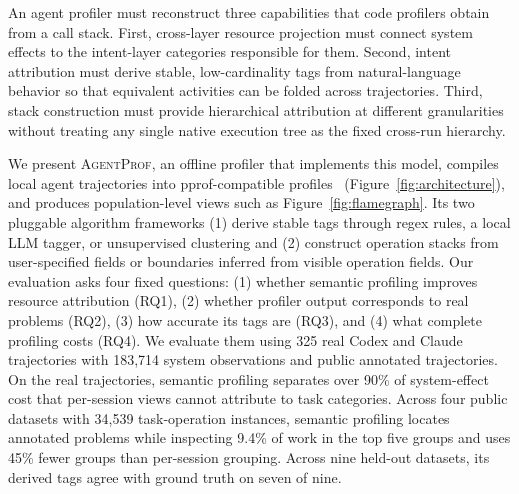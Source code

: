 \documentclass[letterpaper]{article}
\newcommand{\sys}{\textsc{AgentProf}\xspace}
\begin{document}
An agent profiler must reconstruct three capabilities that code profilers
obtain from a call stack.
First, cross-layer resource projection must connect system effects to
the intent-layer categories responsible for them.
Second, intent attribution must derive stable, low-cardinality tags
from natural-language behavior so that equivalent activities can be
folded across trajectories.
Third, stack construction must provide hierarchical attribution at
different granularities without treating any single native execution
tree as the fixed cross-run hierarchy.

We present \sys, an offline profiler that implements this model,
compiles local agent trajectories into pprof-compatible profiles~\cite{pprof}
(Figure~\ref{fig:architecture}), and produces population-level views
such as Figure~\ref{fig:flamegraph}.
Its two pluggable algorithm frameworks (1) derive stable tags through regex
rules, a local LLM tagger, or unsupervised clustering and (2) construct
operation stacks from user-specified fields or boundaries inferred from
visible operation fields.
Our evaluation asks four fixed questions: (1) whether semantic profiling
improves resource attribution (RQ1), (2) whether profiler output corresponds
to real problems (RQ2), (3) how accurate its tags are (RQ3), and
(4) what complete profiling costs (RQ4).
We evaluate them using 325 real Codex and Claude trajectories with 183{,}714
system observations and public annotated trajectories.
On the real trajectories, semantic profiling separates over 90\% of
system-effect cost that per-session views cannot attribute to task
categories.
Across four public datasets with 34{,}539 task-operation instances, semantic profiling
locates annotated problems while inspecting 9.4\% of work in the top five
groups and uses 45\% fewer groups than per-session grouping. Across nine
held-out datasets, its derived tags agree with ground truth on seven of nine.
\end{document}
